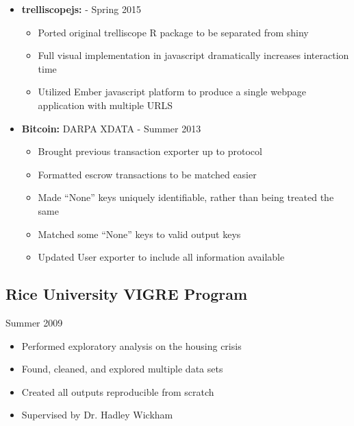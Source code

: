\documentclass[oneside]{article}
\begin{document}
\begin{itemize}
  \item{\bf trelliscopejs:} - Spring 2015
    \begin{itemize}      
      \item Ported original trelliscope R package to be separated from shiny
      \item Full visual implementation in javascript dramatically increases interaction time
      \item Utilized Ember javascript platform to produce a single webpage application with multiple URLS
    \end{itemize}


  \item{\bf Bitcoin:} DARPA XDATA - Summer 2013
    \begin{itemize}      
      \item Brought previous transaction exporter up to protocol
      \item Formatted escrow transactions to be matched easier
      \item Made ``None'' keys uniquely identifiable, rather than being treated the same
      \item Matched some ``None'' keys to valid output keys
      \item Updated User exporter to include all information available
    \end{itemize}
\end{itemize}


\subsection{Rice University VIGRE Program} Summer 2009
\begin{itemize}
  \item Performed exploratory analysis on the housing crisis
  \item Found, cleaned, and explored multiple data sets
  \item Created all outputs reproducible from scratch
  \item Supervised by Dr. Hadley Wickham
\end{itemize}
\end{document}
